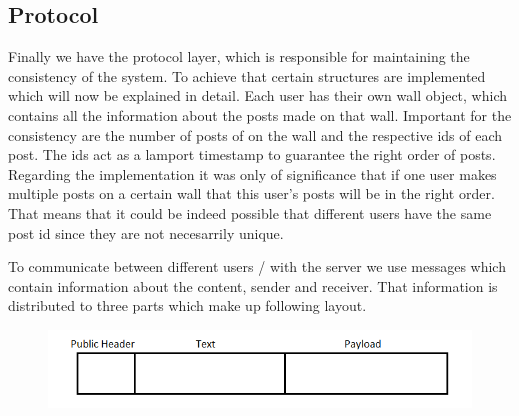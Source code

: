 \documentclass{report}
\newcommand{\lfig}[1]{\label{fig:#1}}
\begin{document}
\subsection{Protocol}
Finally we have the protocol layer, which is responsible for maintaining the consistency of the system. To achieve that certain structures are implemented which will now be explained in detail.
Each user has their own wall object, which contains all the information about the posts made on that wall. Important for the consistency are the number of posts of on the wall and the respective ids of each post. The ids act as a lamport timestamp to guarantee the right order of posts. Regarding the implementation it was only of significance that if one user makes multiple posts on a certain wall that this user's posts will be in the right order. That means that it could be indeed possible that different users have the same post id since they are not necesarrily unique.

To communicate between different users / with the server we use messages which contain information about the content, sender and receiver. That information is distributed to three parts which make up following layout.

\begin{figure}[H]

	\centering
    \includegraphics[width=\columnwidth]{Layout.png}
    \lfig{Layout}
    \vspace{-5mm} %
\end{figure}
\end{document}
